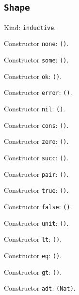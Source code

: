 \documentclass[11pt]{article}
\begin{document}
\subsection*{\texttt{Shape}}
\noindent Kind: \texttt{inductive}.\par
\noindent Constructor \texttt{none}: \texttt{()}.\par
\noindent Constructor \texttt{some}: \texttt{()}.\par
\noindent Constructor \texttt{ok}: \texttt{()}.\par
\noindent Constructor \texttt{error}: \texttt{()}.\par
\noindent Constructor \texttt{nil}: \texttt{()}.\par
\noindent Constructor \texttt{cons}: \texttt{()}.\par
\noindent Constructor \texttt{zero}: \texttt{()}.\par
\noindent Constructor \texttt{succ}: \texttt{()}.\par
\noindent Constructor \texttt{pair}: \texttt{()}.\par
\noindent Constructor \texttt{true}: \texttt{()}.\par
\noindent Constructor \texttt{false}: \texttt{()}.\par
\noindent Constructor \texttt{unit}: \texttt{()}.\par
\noindent Constructor \texttt{lt}: \texttt{()}.\par
\noindent Constructor \texttt{eq}: \texttt{()}.\par
\noindent Constructor \texttt{gt}: \texttt{()}.\par
\noindent Constructor \texttt{adt}: \texttt{(Nat)}.\par
\end{document}
